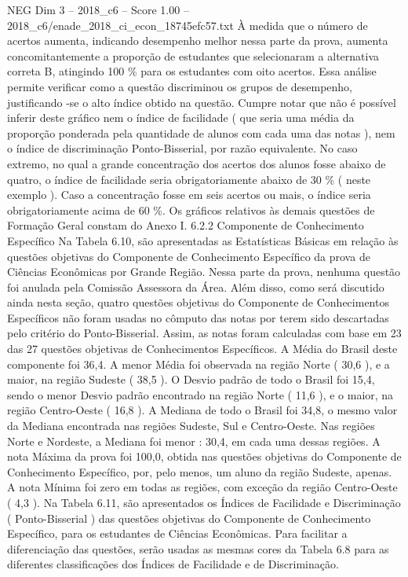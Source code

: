 \begin{textsample}{NEG Dim 3 – 2018\_c6 – Score 1.00 – 2018\_c6/enade\_2018\_ci\_econ\_18745efc57.txt}
À medida que o número de acertos aumenta, indicando desempenho melhor nessa parte da prova, aumenta concomitantemente a proporção de estudantes que selecionaram a alternativa correta B, atingindo 100 \% para os estudantes com oito acertos.
Essa análise permite verificar como a questão discriminou os grupos de desempenho, justificando -se o alto índice obtido na questão.
Cumpre notar que não é possível inferir deste gráfico nem o índice de facilidade ( que seria uma média da proporção ponderada pela quantidade de alunos com cada uma das notas ), nem o índice de discriminação Ponto-Bisserial, por razão equivalente.
No caso extremo, no qual a grande concentração dos acertos dos alunos fosse abaixo de quatro, o índice de facilidade seria obrigatoriamente abaixo de 30 \% ( neste exemplo ).
Caso a concentração fosse em seis acertos ou mais, o índice seria obrigatoriamente acima de 60 \%.
Os gráficos relativos às demais questões de Formação Geral constam do Anexo I. 6.2.2 Componente de Conhecimento Específico Na Tabela 6.10, são apresentadas as Estatísticas Básicas em relação às questões objetivas do Componente de Conhecimento Específico da prova de Ciências Econômicas por Grande Região.
Nessa parte da prova, nenhuma questão foi anulada pela Comissão Assessora da Área.
Além disso, como será discutido ainda nesta seção, quatro questões objetivas do Componente de Conhecimentos Específicos não foram usadas no cômputo das notas por terem sido descartadas pelo critério do Ponto-Bisserial.
Assim, as notas foram calculadas com base em 23 das 27 questões objetivas de Conhecimentos Específicos.
A Média do Brasil deste componente foi 36,4.
A menor Média foi observada na região Norte ( 30,6 ), e a maior, na região Sudeste ( 38,5 ).
O Desvio padrão de todo o Brasil foi 15,4, sendo o menor Desvio padrão encontrado na região Norte ( 11,6 ), e o maior, na região Centro-Oeste ( 16,8 ).
A Mediana de todo o Brasil foi 34,8, o mesmo valor da Mediana encontrada nas regiões Sudeste, Sul e Centro-Oeste.
Nas regiões Norte e Nordeste, a Mediana foi menor : 30,4, em cada uma dessas regiões.
A nota Máxima da prova foi 100,0, obtida nas questões objetivas do Componente de Conhecimento Específico, por, pelo menos, um aluno da região Sudeste, apenas.
A nota Mínima foi zero em todas as regiões, com exceção da região Centro-Oeste ( 4,3 ).
Na Tabela 6.11, são apresentados os Índices de Facilidade e Discriminação ( Ponto-Bisserial ) das questões objetivas do Componente de Conhecimento Específico, para os estudantes de Ciências Econômicas.
Para facilitar a diferenciação das questões, serão usadas as mesmas cores da Tabela 6.8 para as diferentes classificações dos Índices de Facilidade e de Discriminação.

\end{textsample}
